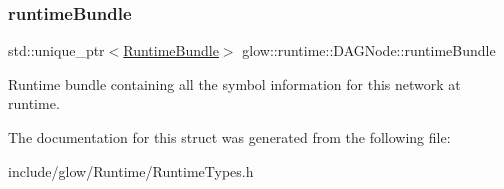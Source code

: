 \subsubsection{\texorpdfstring{runtime\+Bundle}{runtimeBundle}}
{\footnotesize\ttfamily std\+::unique\+\_\+ptr$<$\hyperlink{classglow_1_1runtime_1_1_runtime_bundle}{Runtime\+Bundle}$>$ glow\+::runtime\+::\+D\+A\+G\+Node\+::runtime\+Bundle}

Runtime bundle containing all the symbol information for this network at runtime. 

The documentation for this struct was generated from the following file\+:\begin{DoxyCompactItemize}
\item 
include/glow/\+Runtime/Runtime\+Types.\+h\end{DoxyCompactItemize}
